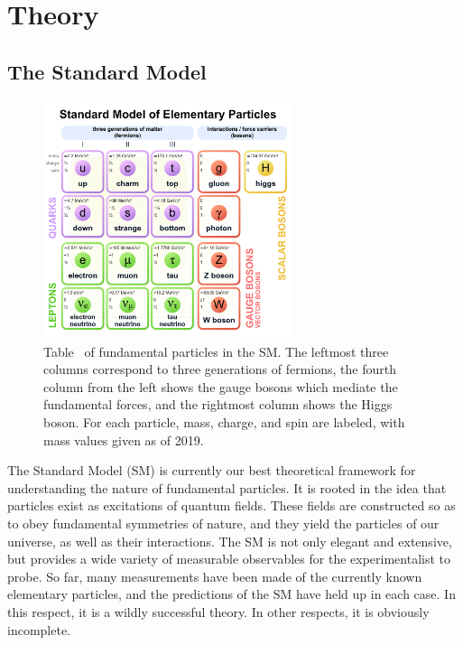 \chapter{Theory}\label{sec:theory}

\section{The Standard Model}

\begin{figure}
	\begin{center}
	\includegraphics[width=0.65\textwidth]{fig/theory/Standard_Model_of_Elementary_Particles.png}
		\caption[Table of fundamental particles in the SM. The leftmost three columns correspond to three generations of fermions, 
		the fourth column from the left shows the gauge bosons which mediate the fundamental forces, and the rightmost column shows the Higgs boson. 
		For each particle, mass, charge, and spin are labeled, with mass values given as of 2019.]
		{Table~\cite{SMImage} of fundamental particles in the SM. The leftmost three columns correspond to three generations of fermions, 
		the fourth column from the left shows the gauge bosons which mediate the fundamental forces, and the rightmost column shows the Higgs boson. 
		For each particle, mass, charge, and spin are labeled, with mass values given as of 2019.}
		\label{fig:SMParticles}
	\end{center}
\end{figure}


The Standard Model (SM) is currently our best theoretical framework for understanding the nature of fundamental particles. 
It is rooted in the idea that particles exist as excitations of quantum fields. These fields are constructed so as to obey 
fundamental symmetries of nature, and they yield the particles of our universe, as well as their interactions. The SM is not only 
elegant and extensive, but provides a wide variety of measurable observables for the experimentalist to probe. So far, many 
measurements have been made of the currently known elementary particles, and the predictions of the SM have held up in each case. In 
this respect, it is a wildly successful theory. In other respects, it is obviously incomplete.

